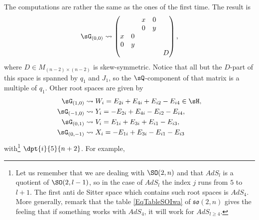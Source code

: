 The computations are rather the same as the ones of the first time. The result is\label{pg:root_n}
\begin{equation}
	\sG_{(0,0)}\leadsto
	\begin{pmatrix}
		  &   & x & 0     \\
		  &   & 0 & y     \\
		x & 0             \\
		0 & y             \\
		  &   &   &   & D
	\end{pmatrix},
\end{equation}
where $D\in M_{(n-2)\times(n-2)}$ is skew-symmetric. Notice that all but the $D$-part of this space is spanned by $q_1$ and $J_1$, so the $\sQ$-component of that matrix is a multiple of $q_1$. Other root spaces are given by
\begin{subequations}
	\begin{align}
		\sG_{(1,0)}  & \leadsto W_i=E_{2i}+E_{4i}+E_{i2}-E_{i4}\in\sH, \\
		\sG_{(-1,0)} & \leadsto Y_i=-E_{2i}+E_{4i}-E_{i2}-E_{i4},      \\
		\sG_{(0,1)}  & \leadsto V_i=E_{1i}+E_{3i}+E_{i1}-E_{i3},       \\
		\sG_{(0,-1)} & \leadsto X_i=-E_{1i}+E_{3i}-E_{i1}-E_{i3}
	\end{align}
\end{subequations}
with\footnote{Let us remember that we are dealing with $\SO(2,n)$ and that $AdS_{l}$ is a quotient of $\SO(2,l-1)$, so in the case of $AdS_{l}$ the index $j$ runs from $5$ to $l+1$. The first anti de Sitter space which contains such root spaces is $AdS_{4}$. More generally, remark that the table \eqref{EqTableSOIwa} of $\mathfrak{so}(2,n)$ gives the feeling that if something works with $AdS_4$, it will work for $AdS_{l\geq 4}$.} $\dpt{i}{5}{n+2}$. For example,
